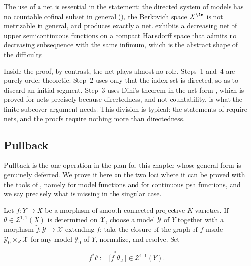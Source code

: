 \begin{remark}
\label{rem:ch21-decreasing-nets}
The use of a net is essential in the statement: the directed system of
models has no countable cofinal subset in general
(), the Berkovich space $X^{\An}$ is
not metrizable in general, and 
produces exactly a net.   exhibits a
decreasing net of upper semicontinuous functions on a compact Hausdorff
space that admits no decreasing subsequence with the same infimum, which is
the abstract shape of the difficulty.

Inside the proof, by contrast, the net plays almost no role.  Steps~1
and~4 are purely order-theoretic.  Step~2 uses only that the index set is
directed, so as to discard an initial segment.  Step~3 uses Dini's theorem
in the net form , which is proved for nets precisely
because directedness, and not countability, is what the finite-subcover
argument needs.  This division is typical: the statements of
 require nets, and the proofs require nothing more than
directedness.
\end{remark}

\subsection{Pullback}
\label{sec:ch21-pullback}

Pullback is the one operation in the plan for this chapter whose general
form is genuinely deferred.  We prove it here on the two loci where it can
be proved with the tools of , namely for model
functions and for continuous psh functions, and we say precisely what is
missing in the singular case.

Let $f:Y\to X$ be a morphism of smooth connected projective
$K$-varieties.  If $\theta\in\mathcal Z^{1,1}(X)$ is determined on
$\mathcal X$, choose a model $\mathcal Y$ of $Y$ together with a
morphism $\tilde f:\mathcal Y\to\mathcal X$ extending $f$: take the
closure of the graph of $f$ inside $\mathcal Y_0\times_R\mathcal X$ for
any model $\mathcal Y_0$ of $Y$, normalize, and resolve.  Set

\begin{equation}
\label{eq:ch21-pullback-form}
 f^*\theta:=\bigl[\tilde f^*\theta_{\mathcal X}\bigr]
 \in\mathcal Z^{1,1}(Y).
\end{equation}

